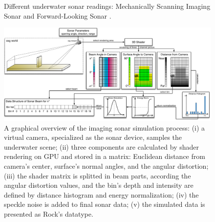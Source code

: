 \documentclass[final,5p,times]{elsarticle}
\begin{document}
\begin{figure}[h]
    \centering
    \captionsetup{justification=centering}
    \caption{Different underwater sonar readings: Mechanically Scanning Imaging Sonar  and Forward-Looking Sonar .}
    \label{fig:sonar_devices}
\end{figure}


\begin{figure}[!h]
    \includegraphics[width=0.85\paperwidth]{figs/sonar_sim}
    \centering
    \captionsetup{justification=centering}
    \caption{A graphical overview of the imaging sonar simulation process: (i) a virtual camera, specialized as the sonar device, samples the underwater scene; (ii) three components are calculated by shader rendering on GPU and stored in a matrix: Euclidean distance from camera's center, surface's normal angles, and the angular distortion; (iii) the shader matrix is splitted in beam parts, according the angular distortion values, and the bin's depth and intensity are defined by distance histogram and energy normalization; (iv) the speckle noise is added to final sonar data; (v) the simulated data is presented as Rock's datatype.}
    \label{fig:sonar_sim}
\end{figure}
\end{document}
